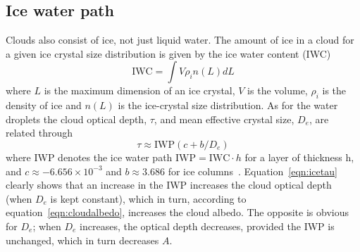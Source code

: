 \subsection{Ice water path}
 Clouds also consist of ice, not just liquid water. The amount of ice in a cloud for a given ice crystal size distribution is given by the ice water content (IWC)~\cite{Liou2002}
\begin{equation}
\text{IWC} = \int V \rho_i n(L)dL
\end{equation}
where $L$ is the maximum dimension of an ice crystal, $V$ is the volume, $\rho_i$ is the density of ice and $n(L)$ is the ice-crystal size distribution. As for the water droplets the cloud optical depth, $\tau$, and mean effective crystal size, $D_e$, are related through
\begin{equation}
\tau \approx \text{IWP}(c + b/D_e)
\label{eqn:icetau}
\end{equation}
where IWP denotes the ice water path $\text{IWP} = \text{IWC} \cdot h$ for a layer of thickness h, and $c \approx -6.656 \times 10^{-3}$ and $b \approx 3.686$ for ice columns~\citep{Liou2002}. Equation~\ref{eqn:icetau} clearly shows that an increase in the IWP increases the cloud optical depth (when $D_e$ is kept constant), which in turn, according to equation~\ref{eqn:cloudalbedo}, increases the cloud albedo. The opposite is obvious for $D_e$; when $D_e$ increases, the optical depth decreases, provided the IWP is unchanged, which in turn decreases $A$.

